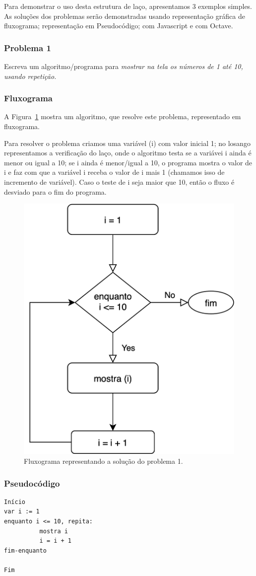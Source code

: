 Para demonstrar o uso desta estrutura de laço, apresentamos 3 exemplos simples. As soluções dos problemas serão demonstradas usando representação gráfica de fluxograma;  representação em Pseudocódigo; com Javascript e com Octave. 

\subsubsection{Problema 1}
Escreva um algoritmo/programa para \emph{mostrar na tela os números de 1 até 10, usando repetição.}

\subsubsection{Fluxograma}
A Figura~\ref{fig:problema1} mostra um algoritmo, que resolve este problema, representado em fluxograma. 

Para resolver o problema criamos uma variável (i) com valor inicial 1; no losango representamos a verificação do laço, onde o algoritmo testa se a variávei i ainda é menor ou igual a 10; se i ainda é menor/igual a 10, o programa mostra o valor de i e faz com que a variável i receba o valor de i mais 1 (chamamos isso de incremento de variável). Caso o teste de i seja maior que 10, então o fluxo é desviado para o fim do programa.

\begin{figure}[h]
  \begin{center}
    \includegraphics[width=0.5\linewidth]{img/problema1.png}
    \caption{Fluxograma representando a solução do problema 1.}
    \label{fig:problema1}
  \end{center}
\end{figure}

\subsubsection{Pseudocódigo}
\begin{verbatim}
Início
var i := 1
enquanto i <= 10, repita:
          mostra i
          i = i + 1
fim-enquanto

Fim
\end{verbatim}


